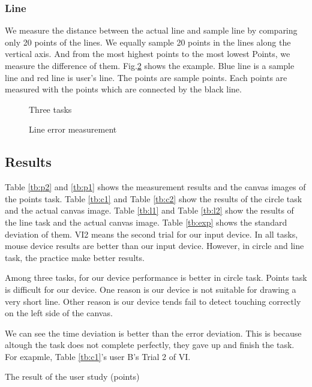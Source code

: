 \subsubsection{Line}
We measure the distance between the actual line and sample line by comparing only 20 points of the lines. We equally sample 20 points in the lines along the vertical axis. And from the most highest points to the most lowest Points, we measure the difference of them.
Fig.\ref{linem} shows the example. Blue line is a sample line and red line is user's line. The points are sample points. Each points are measured with the points which are connected by the black line.
\begin{figure}[htbp]

 \caption{Three tasks}
 \label{task}
\end{figure}

\begin{figure}[htbp]
 \centering
 
 \caption{Line error measurement}
 \label{linem}
\end{figure}


\subsection{Results}
Table \ref{tb:p2} and \ref{tb:p1} shows the measurement results and the canvas images of the points task. Table \ref{tb:c1} and Table \ref{tb:c2} show the results of the circle task and the actual canvas image. Table \ref{tb:l1} and Table \ref{tb:l2} show the results of the line task and the actual canvas image. Table \ref{tb:exp} shows the standard deviation of them. 
VI2 means the second trial for our input device. 
In all tasks, mouse device results are better than our input device. 
However, in circle and line task, the practice make better results.

Among three tasks, for our device performance is better in circle task.
Points task is difficult for our device. One reason is our device is not suitable for drawing a very short line. 
Other reason is our device tends fail to detect touching correctly on the left side of the canvas.

We can see the time deviation is better than the error deviation.
This is because altough the task does not complete perfectly, they gave up and finish the task. For exapmle, Table \ref{tb:c1}'s user B's Trial 2 of VI.

\begin{table}[htbp]
 \centering
 \caption{The result of the user study (points)}
 \label{tb:p1}
 
\end{table}


